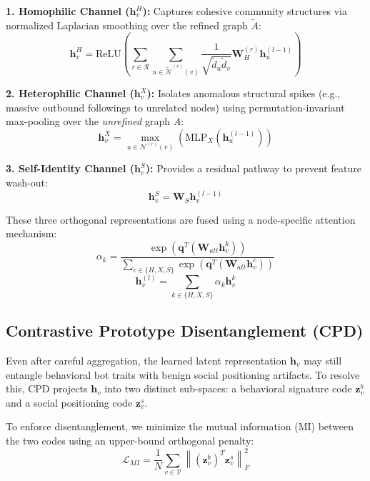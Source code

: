 \textbf{1. Homophilic Channel ($\mathbf{h}^{H}_v$):} Captures cohesive community structures via normalized Laplacian smoothing over the refined graph $\tilde{A}$:
\begin{equation}
    \mathbf{h}^{H}_v = \text{ReLU} \left( \sum_{r \in \mathcal{R}} \sum_{u \in \tilde{\mathcal{N}}^{(r)}(v)} \frac{1}{\sqrt{\tilde{d}_u \tilde{d}_v}} \mathbf{W}_H^{(r)} \mathbf{h}^{(l-1)}_u \right)
\end{equation}

\textbf{2. Heterophilic Channel ($\mathbf{h}^{X}_v$):} Isolates anomalous structural spikes (e.g., massive outbound followings to unrelated nodes) using permutation-invariant max-pooling over the \textit{unrefined} graph $A$:
\begin{equation}
    \mathbf{h}^{X}_v = \max_{u \in \mathcal{N}^{(r)}(v)} \left( \text{MLP}_X (\mathbf{h}^{(l-1)}_u) \right)
\end{equation}

\textbf{3. Self-Identity Channel ($\mathbf{h}^{S}_v$):} Provides a residual pathway to prevent feature wash-out:
\begin{equation}
    \mathbf{h}^{S}_v = \mathbf{W}_S \mathbf{h}^{(l-1)}_v
\end{equation}

These three orthogonal representations are fused using a node-specific attention mechanism:
\begin{equation}
    \alpha_k = \frac{\exp(\mathbf{q}^T (\mathbf{W}_{att} \mathbf{h}^k_v))}{\sum_{c \in \{H, X, S\}} \exp(\mathbf{q}^T (\mathbf{W}_{att} \mathbf{h}^c_v))}
\end{equation}
\begin{equation}
    \mathbf{h}^{(l)}_v = \sum_{k \in \{H, X, S\}} \alpha_k \mathbf{h}^k_v
\end{equation}

\subsection{Contrastive Prototype Disentanglement (CPD)}
Even after careful aggregation, the learned latent representation $\mathbf{h}_v$ may still entangle behavioral bot traits with benign social positioning artifacts. To resolve this, CPD projects $\mathbf{h}_v$ into two distinct sub-spaces: a behavioral signature code $\mathbf{z}^b_v$ and a social positioning code $\mathbf{z}^s_v$.

To enforce disentanglement, we minimize the mutual information (MI) between the two codes using an upper-bound orthogonal penalty:
\begin{equation}
    \mathcal{L}_{MI} = \frac{1}{N} \sum_{v \in \mathcal{V}} \left\| (\mathbf{z}^b_v)^T \mathbf{z}^s_v \right\|_F^2
\end{equation}


